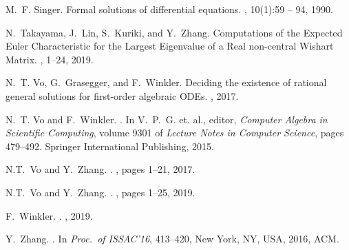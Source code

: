 \documentclass[10pt,a4paper]{article}
\begin{document}
\begin{thebibliography}{10}
M.~F. Singer.
\newblock Formal solutions of differential equations.
, 10(1):59 -- 94, 1990.

N.~Takayama, J.~Lin, S.~Kuriki, and Y.~Zhang.
\newblock Computations of the Expected Euler Characteristic for the Largest Eigenvalue of a Real non-central Wishart Matrix. 
, 1--24, 2019. 

N.~T. Vo, G.~Grasegger, and F.~Winkler.
\newblock Deciding the existence of rational general solutions for first-order
  algebraic {ODEs}.
, 2017.

N.~T. Vo and F.~Winkler.
.
\newblock In V.~P.~G. et. al., editor, {\em {Computer Algebra in Scientific
  Computing}}, volume 9301 of {\em Lecture Notes in Computer Science}, pages
  479--492. Springer International Publishing, 2015.
  
N.T.~Vo and Y.~Zhang.
.
, pages 1--21,  2017.

N.T.~Vo and Y.~Zhang.
.
, pages 1--25,  2019.

F.~Winkler.
.
, 2019. 

Y.~Zhang.
.
\newblock In {\em Proc.\ of ISSAC'16},  413--420, New York, NY, USA, 2016, ACM.

\end{thebibliography}
\end{document}
